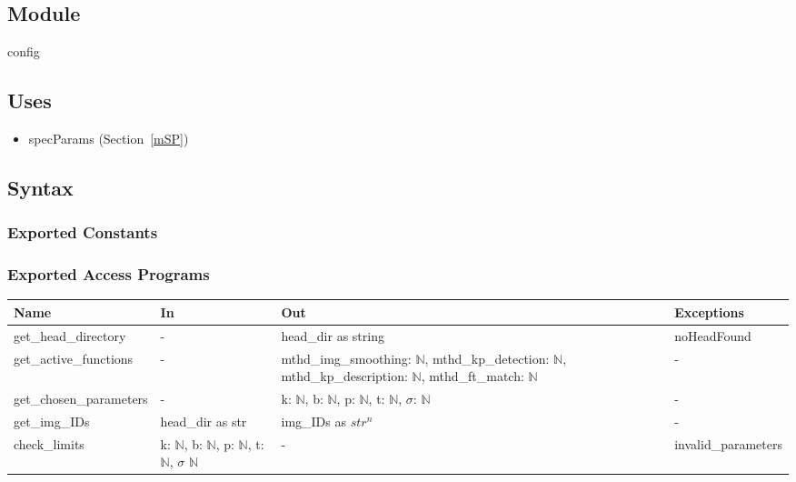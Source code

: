 \documentclass[12pt, titlepage]{article}
\begin{document}
\subsection{Module}

config

\subsection{Uses}
\begin{itemize}
\item specParams (Section~\ref{mSP})
\end{itemize}

\subsection{Syntax}

\subsubsection{Exported Constants}

\subsubsection{Exported Access Programs}
\begin{tabular}{p{4cm} p{4cm} p{4.5cm} p{3.5cm}}
\hline
\textbf{Name} & \textbf{In} & \textbf{Out} & \textbf{Exceptions} \\
\hline
get\_head\_directory 
& - 
& head\_dir as string 
& noHeadFound \\
\hline
get\_active\_functions 
& - 
& mthd\_img\_smoothing: $\mathbb{N}$, \newline 
mthd\_kp\_detection: $\mathbb{N}$, \newline 
mthd\_kp\_description: $\mathbb{N}$, \newline 
mthd\_ft\_match: $\mathbb{N}$
& - \\
\hline
get\_chosen\_parameters & - 
& k: $\mathbb{N}$, \newline 
b: $\mathbb{N}$, \newline  
p: $\mathbb{N}$, \newline 
t: $\mathbb{N}$, \newline 
$\sigma$: $\mathbb{N}$
& - \\
\hline
get\_img\_IDs 
& head\_dir as str 
& img\_IDs as $str^{n}$ 
& - \\
\hline
check\_limits 
& k: $\mathbb{N}$, \newline 
b: $\mathbb{N}$, \newline  
p: $\mathbb{N}$, \newline 
t: $\mathbb{N}$, \newline 
$\sigma$ $\mathbb{N}$
& - 
& invalid\_parameters\\
\hline
\end{tabular}
\end{document}
